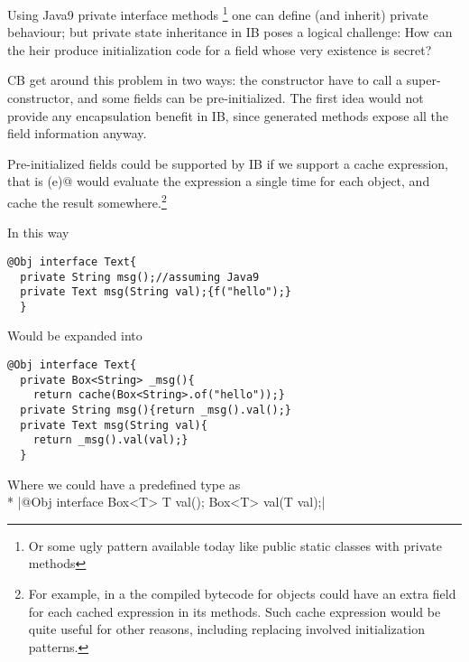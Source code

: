Using Java9 private interface methods%
\footnote{Or some ugly pattern available today like public static classes with private methods}
one can define (and inherit) private behaviour; but private state inheritance in IB poses a logical challenge:
How can the heir produce initialization code for a field whose very existence is secret?

CB get around this problem in two ways: the constructor have to call a super-constructor, and
some fields can be pre-initialized.
The first idea would not provide any encapsulation benefit in IB,
since generated \Q@of@ methods expose all the field information anyway.

Pre-initialized fields could be supported by IB if we support a cache expression,
that is \Q@cache(e)@ would evaluate the expression a single time for each object, and cache the result
somewhere.\footnote{
For example, in a the compiled bytecode for objects
could have an extra field for each cached expression in its methods.
Such cache expression would be quite useful for other reasons,
including replacing involved initialization patterns.}

In this way
\begin{lstlisting}
@Obj interface Text{
  private String msg();//assuming Java9
  private Text msg(String val);{f("hello");}
  }
\end{lstlisting}
Would be expanded into 
\begin{lstlisting}
@Obj interface Text{
  private Box<String> _msg(){
    return cache(Box<String>.of("hello"));}
  private String msg(){return _msg().val();}
  private Text msg(String val){
    return _msg().val(val);}
  }
\end{lstlisting}

Where we could have a predefined \Q@Box@ type as\\*
\Q|@Obj interface Box<T>{ T val(); Box<T> val(T val);}|




